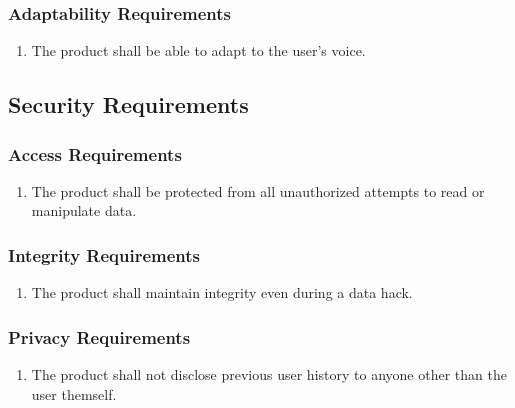 \documentclass[]{article}
\newcounter{saveenum}
\newcommand{\pauseEnum}{\setcounter{saveenum}{\value{enumi}}}
\newcommand{\resumeEnum}{\setcounter{enumi}{\value{saveenum}}}
\begin{document}
\subsubsection{Adaptability Requirements}
\label{ssub:adaptability_requirements}
\begin{enumerate}[{MS}1. ]
	\resumeEnum
	\item The product shall be able to adapt to the user's voice.
	\pauseEnum
\end{enumerate}


\subsection{Security Requirements}
\label{sub:security_requirements}

\subsubsection{Access Requirements}
\label{ssub:access_requirements}
\begin{enumerate}[{SR}1. ]
	\item The product shall be protected from all unauthorized attempts to read or manipulate data.
	\pauseEnum
\end{enumerate}

\subsubsection{Integrity Requirements}
\label{ssub:integrity_requirements}
\begin{enumerate}[{SR}1. ]
	\resumeEnum
	\item The product shall maintain integrity even during a data hack.
	\pauseEnum
\end{enumerate}

\subsubsection{Privacy Requirements}
\label{ssub:privacy_requirements}
\begin{enumerate}[{SR}1. ]
	\resumeEnum
	\item The product shall not disclose previous user history to anyone other than the user themself.
	\pauseEnum
\end{enumerate}
\end{document}
